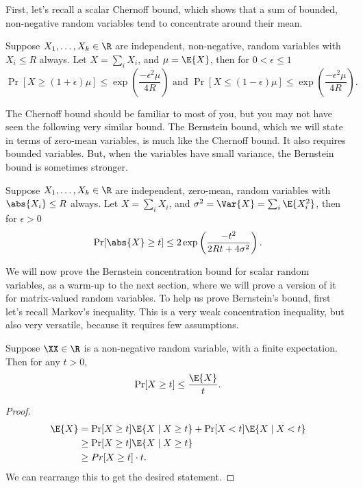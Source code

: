 First, let's recall a scalar Chernoff bound, which shows that a sum of
bounded, non-negative random variables tend to concentrate around
their mean.
\begin{theorem}
Suppose $X_1, \ldots, X_k \in \R$ are independent, non-negative,
random variables with $X_i \leq R$ always.
Let $X = \sum_i X_i$, and $\mu = \E{X}$,
then for $0 < \epsilon \leq 1$
\[
\Pr[ X \geq (1+\epsilon) \mu ] \leq \exp\left(\frac{-\epsilon^2
    \mu}{4R}\right)
\text{ and }
\Pr[ X \leq (1-\epsilon) \mu] \leq \exp\left(\frac{-\epsilon^2
    \mu}{4R}\right)
.
  \]
\end{theorem}
The Chernoff bound should be familiar to most of you, but you may not
have seen the following very similar bound.
The Bernstein bound, which we will state in terms of zero-mean
variables, is much like the Chernoff bound.
It also requires bounded variables.
But, when the variables have small variance, the Bernstein bound is
sometimes stronger.
\begin{theorem}
  \label{thm:bernstein}
  Suppose $X_1, \ldots, X_k \in \R$ are independent, zero-mean,
random variables with $\abs{X_i} \leq R$ always.
Let $X = \sum_i X_i$, and $\sigma^2 = \Var{X} = \sum_i \E{X_i^2}$,
then for $\epsilon > 0$
\[
\Pr[ \abs{X} \geq t] \leq 2\exp\left(\frac{-t^2}{2Rt +
    4\sigma^2}\right)
.
  \]
\end{theorem}
We will now prove the Bernstein concentration bound for scalar random
variables, as a warm-up to the next section, where we will prove a version
of it for matrix-valued random variables.
To help us prove Bernstein's bound, first let's recall Markov's
inequality.
This is a very weak concentration inequality, but also very versatile,
because it requires few assumptions.
\begin{lemma}
  \label{lem:markov}
  Suppose $\XX \in \R$ is a non-negative random variable, with a finite
  expectation.
  Then for any $t > 0$,
  \[
    \Pr[ X \geq t] \leq \frac{\E{X}}{t}
    .
    \]
\end{lemma}
\begin{proof}
  \begin{align*}
    \E{X}
    &=
      \Pr[X \geq t]\E{X \mid X \geq t} + \Pr[X < t]\E{X \mid X < t}
   \\
    &\geq \Pr[X \geq t]\E{X \mid X \geq t}
    \\
    &\geq Pr[X \geq t] \cdot t
      .
\end{align*}
  We can rearrange this to get the desired statement.
\end{proof}
